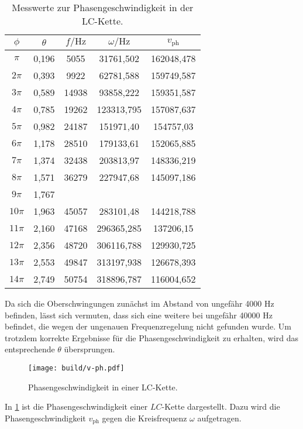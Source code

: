   \begin{table}
    \centering
    \caption{Messwerte zur Phasengeschwindigkeit in der LC-Kette.}
    \label{tab:v-phase}
    \begin{tabular}{c c c c c}
      \toprule
      $\phi$ & $\theta$ & $f / \si{\hertz}$ & $\omega / \si{\hertz}$ & $v_\mathrm{ph}$ \\
      \midrule
$\pi$ & 0,196 & 5055 & 31761,502 & 162048,478 \\
$2\pi$ & 0,393 &  9922 &  62781,588 & 159749,587 \\
$3\pi$ & 0,589 & 14938 & 93858,222 & 159351,587 \\
$4\pi$ & 0,785 & 19262 & 123313,795 & 157087,637 \\
$5\pi$ & 0,982 & 24187 & 151971,40 & 154757,03 \\
$6\pi$ & 1,178 & 28510 & 179133,61 & 152065,885 \\
$7\pi$ & 1,374 & 32438 & 203813,97 & 148336,219 \\
$8\pi$ &  1,571 & 36279 & 227947,68 & 145097,186 \\
$9\pi$ & 1,767  \\
$10\pi$ & 1,963 & 45057 & 283101,48 & 144218,788 \\
$11\pi$ &  2,160 & 47168 & 296365,285 & 137206,15 \\
$12\pi$ & 2,356 & 48720 & 306116,788 & 129930,725 \\
$13\pi$ & 2,553 & 49847 & 313197,938 & 126678,393 \\
$14\pi$ & 2,749 & 50754 & 318896,787 & 116004,652 \\
\bottomrule
\end{tabular}
\end{table}

Da sich die Oberschwingungen zunächst im Abstand von ungefähr 4000 \si{\Hz} befinden, lässt sich vermuten, dass sich eine weitere bei ungefähr 40000 \si{\Hz} befindet, die wegen der ungenauen Frequenzregelung nicht gefunden wurde.
Um trotzdem korrekte Ergebnisse für die Phasengeschwindigkeit zu erhalten, wird das entsprechende $\theta$ übersprungen.

\begin{figure}
  \centering
  \texttt{[image: build/v-ph.pdf]}
\caption{Phasengeschwindigkeit in einer LC-Kette.}
  \label{fig:v-ph}
\end{figure}

In \ref{fig:v-ph} ist die Phasengeschwindigkeit einer $LC$-Kette dargestellt. Dazu wird die Phasengeschwindigkeit $v_\mathrm{ph}$ gegen die Kreisfrequenz $\omega$ aufgetragen.

